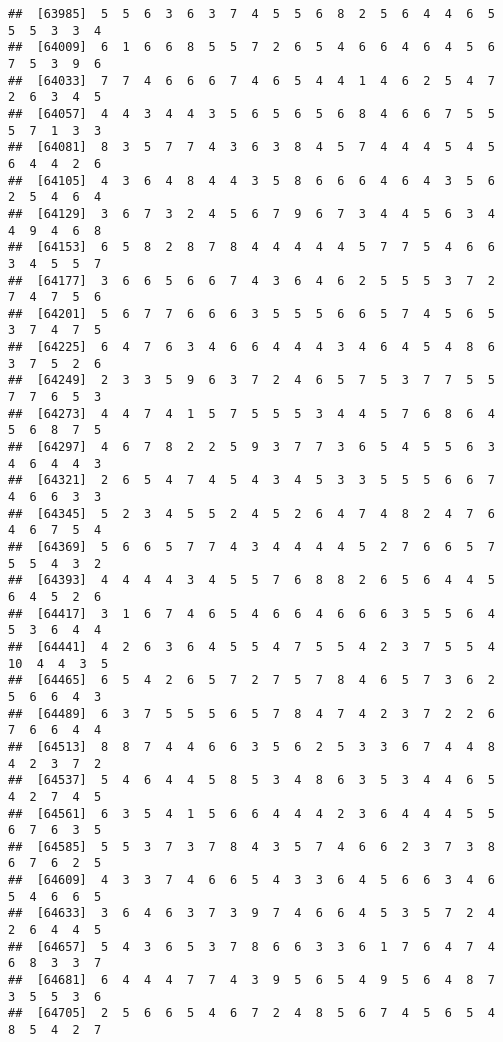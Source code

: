 \documentclass[
]{book}
\begin{document}
\begin{verbatim}
##  [63985]  5  5  6  3  6  3  7  4  5  5  6  8  2  5  6  4  4  6  5  5  5  3  3  4
##  [64009]  6  1  6  6  8  5  5  7  2  6  5  4  6  6  4  6  4  5  6  7  5  3  9  6
##  [64033]  7  7  4  6  6  6  7  4  6  5  4  4  1  4  6  2  5  4  7  2  6  3  4  5
##  [64057]  4  4  3  4  4  3  5  6  5  6  5  6  8  4  6  6  7  5  5  5  7  1  3  3
##  [64081]  8  3  5  7  7  4  3  6  3  8  4  5  7  4  4  4  5  4  5  6  4  4  2  6
##  [64105]  4  3  6  4  8  4  4  3  5  8  6  6  6  4  6  4  3  5  6  2  5  4  6  4
##  [64129]  3  6  7  3  2  4  5  6  7  9  6  7  3  4  4  5  6  3  4  4  9  4  6  8
##  [64153]  6  5  8  2  8  7  8  4  4  4  4  4  5  7  7  5  4  6  6  3  4  5  5  7
##  [64177]  3  6  6  5  6  6  7  4  3  6  4  6  2  5  5  5  3  7  2  7  4  7  5  6
##  [64201]  5  6  7  7  6  6  6  3  5  5  5  6  6  5  7  4  5  6  5  3  7  4  7  5
##  [64225]  6  4  7  6  3  4  6  6  4  4  4  3  4  6  4  5  4  8  6  3  7  5  2  6
##  [64249]  2  3  3  5  9  6  3  7  2  4  6  5  7  5  3  7  7  5  5  7  7  6  5  3
##  [64273]  4  4  7  4  1  5  7  5  5  5  3  4  4  5  7  6  8  6  4  5  6  8  7  5
##  [64297]  4  6  7  8  2  2  5  9  3  7  7  3  6  5  4  5  5  6  3  4  6  4  4  3
##  [64321]  2  6  5  4  7  4  5  4  3  4  5  3  3  5  5  5  6  6  7  4  6  6  3  3
##  [64345]  5  2  3  4  5  5  2  4  5  2  6  4  7  4  8  2  4  7  6  4  6  7  5  4
##  [64369]  5  6  6  5  7  7  4  3  4  4  4  4  5  2  7  6  6  5  7  5  5  4  3  2
##  [64393]  4  4  4  4  3  4  5  5  7  6  8  8  2  6  5  6  4  4  5  6  4  5  2  6
##  [64417]  3  1  6  7  4  6  5  4  6  6  4  6  6  6  3  5  5  6  4  5  3  6  4  4
##  [64441]  4  2  6  3  6  4  5  5  4  7  5  5  4  2  3  7  5  5  4 10  4  4  3  5
##  [64465]  6  5  4  2  6  5  7  2  7  5  7  8  4  6  5  7  3  6  2  5  6  6  4  3
##  [64489]  6  3  7  5  5  5  6  5  7  8  4  7  4  2  3  7  2  2  6  7  6  6  4  4
##  [64513]  8  8  7  4  4  6  6  3  5  6  2  5  3  3  6  7  4  4  8  4  2  3  7  2
##  [64537]  5  4  6  4  4  5  8  5  3  4  8  6  3  5  3  4  4  6  5  4  2  7  4  5
##  [64561]  6  3  5  4  1  5  6  6  4  4  4  2  3  6  4  4  4  5  5  6  7  6  3  5
##  [64585]  5  5  3  7  3  7  8  4  3  5  7  4  6  6  2  3  7  3  8  6  7  6  2  5
##  [64609]  4  3  3  7  4  6  6  5  4  3  3  6  4  5  6  6  3  4  6  5  4  6  6  5
##  [64633]  3  6  4  6  3  7  3  9  7  4  6  6  4  5  3  5  7  2  4  2  6  4  4  5
##  [64657]  5  4  3  6  5  3  7  8  6  6  3  3  6  1  7  6  4  7  4  6  8  3  3  7
##  [64681]  6  4  4  4  7  7  4  3  9  5  6  5  4  9  5  6  4  8  7  3  5  5  3  6
##  [64705]  2  5  6  6  5  4  6  7  2  4  8  5  6  7  4  5  6  5  4  8  5  4  2  7

\end{verbatim}
\end{document}
